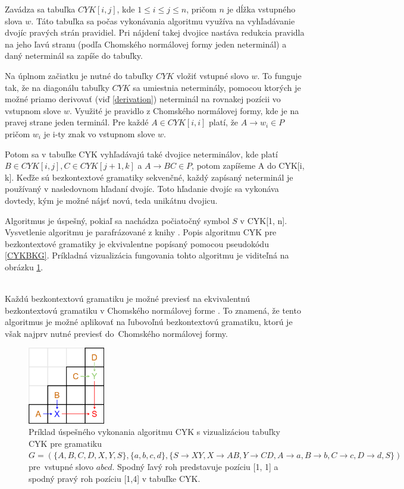 Zavádza sa tabuľka $CYK[i, j]$, kde $1 \leq i \leq j \leq n$, pričom $n$ je dĺžka vstupného slova $w$. Táto tabuľka sa počas vykonávania algoritmu využíva na vyhľadávanie dvojíc pravých strán pravidiel. Pri nájdení takej dvojice nastáva redukcia pravidla na jeho ľavú stranu (podľa Chomského normálovej formy jeden neterminál) a daný neterminál sa zapíše do tabuľky.

Na úplnom začiatku je nutné do tabuľky $CYK$ vložiť vstupné slovo $w$. To funguje tak, že na diagonálu tabuľky $CYK$ sa umiestnia neterminály, pomocou ktorých je možné priamo derivovať (viď \ref{derivation}) neterminál na rovnakej pozícii vo vstupnom slove $w$. Využité je pravidlo z Chomského normálovej formy, kde je na pravej strane jeden terminál. Pre každé $A \in CYK[i, i]$ platí, že $A \to w_i \in P$ pričom $w_i$ je i-ty znak vo vstupnom slove $w$.

Potom sa v tabuľke CYK vyhľadávajú také dvojice neterminálov, kde platí $B \in CYK[i, j], C \in CYK[j+1, k]$ a $A \to BC \in P$, potom zapíšeme A do CYK[i, k]. Keďže sú bezkontextové gramatiky sekvenčné, každý zapísaný neterminál je používaný v nasledovnom hľadaní dvojíc. Toto hľadanie dvojíc sa vykonáva dovtedy, kým je možné nájsť novú, teda unikátnu dvojicu.

Algoritmus je úspešný, pokiaľ sa nachádza počiatočný symbol $S$ v CYK[1, n]. Vysvetlenie algoritmu je parafrázované z knihy \cite{medunaParser}. Popis algoritmu CYK pre bezkontextové gramatiky je ekvivalentne popísaný pomocou pseudokódu \ref{CYKBKG}. Príkladná vizualizácia fungovania tohto algoritmu je viditeľná na obrázku \ref{CYKTable}.

\hfill\\
Každú bezkontextovú gramatiku je možné previesť na ekvivalentnú bezkontextovú gramatiku v Chomského normálovej forme \cite{medunaBase}. To znamená, že tento algoritmus je možné aplikovať na ľubovoľnú bezkontextovú gramatiku, ktorú je však najprv nutné previesť do~Chomského normálovej formy.


\begin{figure}[hbt]
	\centering
	\includegraphics[width=0.3\textwidth]{obrazky-figures/CYKTable.png}
	\caption{Príklad úspešného vykonania algoritmu CYK s vizualizáciou tabuľky CYK pre gramatiku $G = (\{A, B, C, D, X, Y, S\}, \{a, b, c, d\}, \{S \to XY, X \to AB, Y \to CD, A \to a, B \to b, C \to c, D \to d, S\})$ pre~vstupné slovo $abcd$. Spodný ľavý roh predstavuje pozíciu [1, 1] a spodný pravý roh pozíciu [1,4] v tabuľke CYK.}
	\label{CYKTable}
\end{figure}

